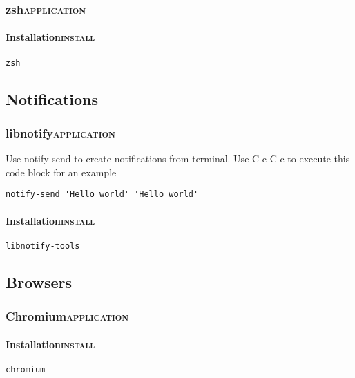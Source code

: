 \documentclass[11pt]{article}
\begin{document}
\subsubsection{zsh\hfill{}\textsc{application}}
\label{sec:org39d1564}
\paragraph{Installation\hfill{}\textsc{install}}
\label{sec:org14d0cbf}
\begin{verbatim}
zsh
\end{verbatim}

\subsection{Notifications}
\label{sec:org8df7687}
\subsubsection{libnotify\hfill{}\textsc{application}}
\label{sec:orgac17d5e}

Use notify-send to create notifications from terminal. Use C-c C-c to execute this code block for an example

\begin{verbatim}
notify-send 'Hello world' 'Hello world'
\end{verbatim}
\paragraph{Installation\hfill{}\textsc{install}}
\label{sec:orgb71d725}
\begin{verbatim}
libnotify-tools
\end{verbatim}

\subsection{Browsers}
\label{sec:org00a45b6}
\subsubsection{Chromium\hfill{}\textsc{application}}
\label{sec:org39a331c}
\paragraph{Installation\hfill{}\textsc{install}}
\label{sec:org6e80e37}
\begin{verbatim}
chromium
\end{verbatim}
\end{document}
